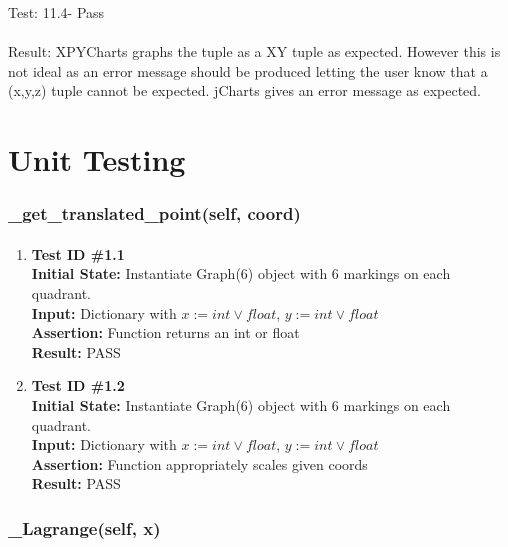\documentclass[12pt, titlepage]{article}
\begin{document}
Test: 11.4- Pass\\\\
Result: XPYCharts graphs the tuple as a XY tuple as expected. However this is not ideal as an error message should be produced letting the user know that a (x,y,z) tuple cannot be expected. jCharts gives an error message as expected.\\

\section{Unit Testing}\label{sec:unittest}


\subsubsection{\_get\_translated\_point(self, coord)}		
	\label{sec:4.0.1}
	\paragraph{}
		\begin{enumerate}
			\item{\textbf{Test ID \#1.1\\}}
			\textbf{Initial State:} Instantiate Graph(6) object with 6 markings on each quadrant.\\
			\textbf{Input:} Dictionary with $x:= int \vee float$, $y:= int \vee float$ \\
			\textbf{Assertion:} Function returns an int or float \\
			\textbf{Result:} PASS
			
			\item{\textbf{Test ID \#1.2\\}}
			\textbf{Initial State:} Instantiate Graph(6) object with 6 markings on each quadrant.\\
			\textbf{Input:} Dictionary with $x:= int \vee float$, $y:= int \vee float$ \\
			\textbf{Assertion:} Function appropriately scales given coords \\
			\textbf{Result:} PASS
			
		\end{enumerate}

\subsubsection{\_Lagrange(self, x)}		
	\label{sec:4.0.2}
\end{document}
